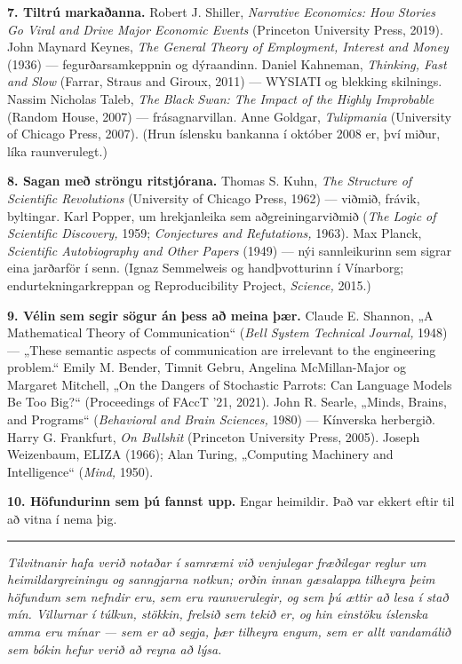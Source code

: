 \textbf{7. Tiltrú markaðanna.} Robert J. Shiller, \emph{Narrative Economics: How Stories Go Viral and Drive Major Economic Events} (Princeton University Press, 2019). John Maynard Keynes, \emph{The General Theory of Employment, Interest and Money} (1936) — fegurðarsamkeppnin og dýraandinn. Daniel Kahneman, \emph{Thinking, Fast and Slow} (Farrar, Straus and Giroux, 2011) — WYSIATI og blekking skilnings. Nassim Nicholas Taleb, \emph{The Black Swan: The Impact of the Highly Improbable} (Random House, 2007) — frásagnarvillan. Anne Goldgar, \emph{Tulipmania} (University of Chicago Press, 2007). (Hrun íslensku bankanna í október 2008 er, því miður, líka raunverulegt.)

\textbf{8. Sagan með ströngu ritstjórana.} Thomas S. Kuhn, \emph{The Structure of Scientific Revolutions} (University of Chicago Press, 1962) — viðmið, frávik, byltingar. Karl Popper, um hrekjanleika sem aðgreiningarviðmið (\emph{The Logic of Scientific Discovery,} 1959; \emph{Conjectures and Refutations,} 1963). Max Planck, \emph{Scientific Autobiography and Other Papers} (1949) — nýi sannleikurinn sem sigrar eina jarðarför í senn. (Ignaz Semmelweis og handþvotturinn í Vínarborg; endurtekningarkreppan og Reproducibility Project, \emph{Science,} 2015.)

\textbf{9. Vélin sem segir sögur án þess að meina þær.} Claude E. Shannon, „A Mathematical Theory of Communication“ (\emph{Bell System Technical Journal,} 1948) — „These semantic aspects of communication are irrelevant to the engineering problem.“ Emily M. Bender, Timnit Gebru, Angelina McMillan-Major og Margaret Mitchell, „On the Dangers of Stochastic Parrots: Can Language Models Be Too Big?“ (Proceedings of FAccT '21, 2021). John R. Searle, „Minds, Brains, and Programs“ (\emph{Behavioral and Brain Sciences,} 1980) — Kínverska herbergið. Harry G. Frankfurt, \emph{On Bullshit} (Princeton University Press, 2005). Joseph Weizenbaum, ELIZA (1966); Alan Turing, „Computing Machinery and Intelligence“ (\emph{Mind,} 1950).

\textbf{10. Höfundurinn sem þú fannst upp.} Engar heimildir. Það var ekkert eftir til að vitna í nema þig.

\plainbreak{2}

\emph{Tilvitnanir hafa verið notaðar í samræmi við venjulegar fræðilegar reglur um heimildargreiningu og sanngjarna notkun; orðin innan gæsalappa tilheyra þeim höfundum sem nefndir eru, sem eru raunverulegir, og sem þú ættir að lesa í stað mín. Villurnar í túlkun, stökkin, frelsið sem tekið er, og hin einstöku íslenska amma eru mínar — sem er að segja, þær tilheyra engum, sem er allt vandamálið sem bókin hefur verið að reyna að lýsa.}

